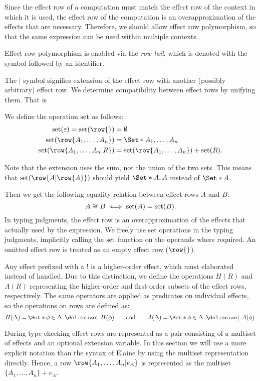 Since the effect row of a computation must match the effect row of the context in which it is used, the effect row of the computation is an overapproximation of the effects that are necessary. Therefore, we should allow effect row polymorphism, so that the same expression can be used within multiple contexts.

Effect row polymorphism is enabled via the \emph{row tail}, which is denoted with the \el{|} symbol followed by an identifier.

The $|$ symbol signifies extension of the effect row with another (possibly arbitrary) effect row. We determine compatibility between effect rows by unifying them. That is

We define the operation $\operatorname{set}$ as follows:
\begin{align*}
    \set(\varepsilon) = \set(\row{}) &= \emptyset\\
    \set(\row{A_1, \dots, A_n}) &= \S{A_1, \dots, A_n}\\
    \set(\row{A_1, \dots, A_n|R}) &= \set(\row{A_1, \dots, A_n}) + \set(R).
\end{align*}

Note that the extension uses the sum, not the union of the two sets. This means that $\set(\row{A | \row{A}})$ should yield $\S{A, A}$ instead of $\S{A}$.

Then we get the following equality relation between effect rows $A$ and $B$:
\[ A \cong B \iff \operatorname{set}(A) = \operatorname{set}(B). \]
In typing judgments, the effect row is an overapproximation of the effects that actually used by the expression. We freely use set operations in the typing judgments, implicitly calling the $\operatorname{set}$ function on the operands where required. An omitted effect row is treated as an empty effect row ($\row{}$).

Any effect prefixed with a $!$ is a higher-order effect, which must elaborated instead of handled. Due to this distinction, we define the operations $H(R)$ and $A(R)$ representing the higher-order and first-order subsets of the effect rows, respectively. The same operators are applied as predicates on individual effects, so the operations on rows are defined as:
\[ 
    H(\Delta) = \S{ \phi \in \Delta \given H(\phi) }
    \qquad
    \text{and}
    \qquad
    A(\Delta) = \S{ \phi \in \Delta \given A(\phi) }.
\]


During type checking effect rows are represented as a pair consisting of a multiset of effects and an optional extension variable. In this section we will use a more explicit notation than the syntax of Elaine by using the multiset representation directly. Hence, a row $\row{A_1,\dots,A_n|e_A}$ is represented as the multiset $\{A_1,\dots,A_n\} + e_A$.

